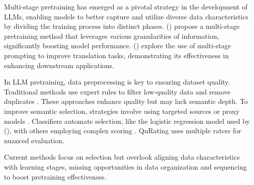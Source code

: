 Multi-stage pretraining has emerged as a pivotal strategy in the development of LLMs, enabling models to better capture and utilize diverse data characteristics by dividing the training process into distinct phases\cite{pavlova2025multi,zhao2024slit,DBLP:journals/corr/abs-2107-14596,tan-etal-2022-msp}. \citeauthor{DBLP:journals/corr/abs-2107-14596} (\citeyear{DBLP:journals/corr/abs-2107-14596}) propose a multi-stage pretraining method that leverages various granularities of information, significantly boosting model performance. \citeauthor{tan-etal-2022-msp} (\citeyear{tan-etal-2022-msp}) explore the use of multi-stage prompting to improve translation tasks, demonstrating its effectiveness in enhancing downstream applications.



In LLM pretraining, data preprocessing is key to ensuring dataset quality. Traditional methods use expert rules to filter low-quality data \cite{raffel2020exploring, rae2021scaling, laurenccon2022bigscience, together2023redpajama, penedo2024fineweb} and remove duplicates \cite{lee2022deduplicating, sorscher2022beyond, abbas2023semdedup, cerebras2023slimpajama, tirumala2024d4}. These approaches enhance quality but may lack semantic depth. To improve semantic selection, strategies involve using targeted sources or proxy models \cite{wenzek2020ccnet, xie2023data, marion2023less, thakkar2023self, engstrom2024dsdm, yu2024mates}. Classifiers automate selection, like the logistic regression model used by \citeauthor{du2022glam} (\citeyear{du2022glam}), with others employing complex scoring \cite{zhang2024autonomous, sachdeva2024train}. QuRating \cite{wettig2024qurating} uses multiple raters for nuanced evaluation.

Current methods focus on selection but overlook aligning data characteristics with learning stages, missing opportunities in data organization and sequencing to boost pretraining effectiveness.